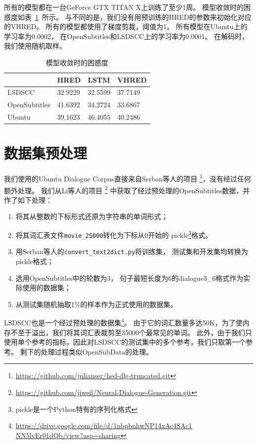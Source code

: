 所有的模型都在一台GeForce GTX TITAN X上训练了至少1周。
模型收敛时的困惑度如表~\ref{tab:converged_perplexity}~所示。
与不同的是，我们没有用预训练的HRED的参数来初始化对应的VHRED。
所有的模型都使用了梯度剪裁，阈值为1。
所有模型在Ubuntu上的学习率为0.0002，
在OpenSubtitles和LSDSCC上的学习率为0.0001。
在解码时，我们使用随机取样。
\begin{table}[H]
    \centering
    \caption{模型收敛时的困惑度}
    \label{tab:converged_perplexity}
    \begin{tabular}{llll}
        \toprule
        \midrule
        & HRED & LSTM & VHRED \\
        \midrule
        LSDSCC & 32.9229 & 32.5599 & 37.7149 \\
        OpenSubtitles & 41.6392 & 34.2724 & 33.6867 \\
        Ubuntu & 39.1623 & 46.4055 & 40.2486 \\
        \bottomrule
    \end{tabular}
\end{table}

\section{数据集预处理}
\label{sec:dataset_proprecessing}
我们使用的Ubuntu Dialogue Corpus直接来自Serban等人的项目
\footnote{\url{https://github.com/julianser/hed-dlg-truncated.git}}，没有经过任何额外处理。
我们从Li等人的项目
\footnote{\url{https://github.com/jiweil/Neural-Dialogue-Generation.git}}
中获取了经过预处理的OpenSubtitles数据，并作了如下处理：
\begin{enumerate}
    \item 将其从整数的下标形式还原为字符串的单词形式；
    \item 将其词汇表文件\texttt{movie\_25000}转化为下标从0开始的 pickle\footnote{pickle是一个Python特有的序列化格式}格式。
    \item 用Serban等人的\texttt{convert\_text2dict.py}将训练集，
    测试集和开发集均转换为pickle格式；
    \item 选用OpenSubtitles中的轮数为3， 句子最短长度为6的dialogue3\_6格式作为实际使用的数据集；
    \item 从测试集随机抽取1\%的样本作为正式使用的数据集。
\end{enumerate}

LSDSCC也是一个经过预处理的数据集\footnote{\url{https://drive.google.com/file/d/1nbpbnhwNP14xAc4SAc1 NN5lvEr01dQb/view?usp=sharing}}。
由于它的词汇数量多达50K，为了使内存不至于溢出，我们将其词汇表裁剪至35000个最常见的单词。
此外，由于我们只使用单个参考的指标，因此对LSDSCC的测试集中的多个参考，我们只取第一个参考。
剩下的处理过程类似OpenSubData的处理。

